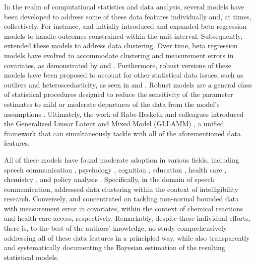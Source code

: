 \documentclass[
  authoryear,
  preprint,
  1p]{elsarticle}
\begin{document}
In the realm of computational statistics and data analysis, several
models have been developed to address some of these data features
individually and, at times, collectively. For instance,
\citet{Ferrari_et_al_2004} and \citet{Simas_et_al_2010} initially
introduced and expanded beta regression models to handle outcomes
constrained within the unit interval. Subsequently,
\citet{Figueroa-Zuniga_et_al_2013} extended these models to address data
clustering. Over time, beta regression models have evolved to
accommodate clustering and measurement errors in covariates, as
demonstrated by \citet{Carrasco_et_al_2012} and
\citet{Figueroa-Zuniga_et_al_2018}. Furthermore, robust versions of
these models have been proposed to account for other statistical data
issues, such as outliers and heteroscedasticity, as seen in
\citet{Bayes_et_al_2012} and \citet{Figueroa-Zuniga_et_al_2021}. Robust
models are a general class of statistical procedures designed to reduce
the sensitivity of the parameter estimates to mild or moderate
departures of the data from the model's assumptions
\citep{Everitt_et_al_2010}. Ultimately, the work of Rabe-Hesketh and
colleagues introduced the Generalized Linear Latent and Mixed Model
(GLLAMM)
\citep{Rabe_et_al_2004a, Rabe_et_al_2004b, Rabe_et_al_2004c, Skrondal_et_al_2004a},
a unified framework that can simultaneously tackle with all of the
aforementioned data features.

All of these models have found moderate adoption in various fields,
including speech communication \citep{Boonen_et_al_2021}, psychology
\citep{Unlu_et_al_2017}, cognition
\citep{Verkuilen_et_al_2012, Lopes_et_al_2023}, education
\citep{Pereira_et_al_2020}, health care
\citep{Ghosh_2019, Kangmennaang_et_al_2023}, chemistry
\citep{de_Brito_et_al_2021}, and policy analysis
\citep{Dieteren_et_al_2023, Choi_2023, Zhang_et_al_2023}. Specifically,
in the domain of speech communication, \citet{Boonen_et_al_2021}
addressed data clustering within the context of intelligibility
research. Conversely, \citet{de_Brito_et_al_2021} and
\citet{Kangmennaang_et_al_2023} concentrated on tackling non-normal
bounded data with measurement error in covariates, within the context of
chemical reactions and health care access, respectively. Remarkably,
despite these individual efforts, there is, to the best of the authors'
knowledge, no study comprehensively addressing all of these data
features in a principled way, while also transparently and
systematically documenting the Bayesian estimation of the resulting
statistical models.
\end{document}
